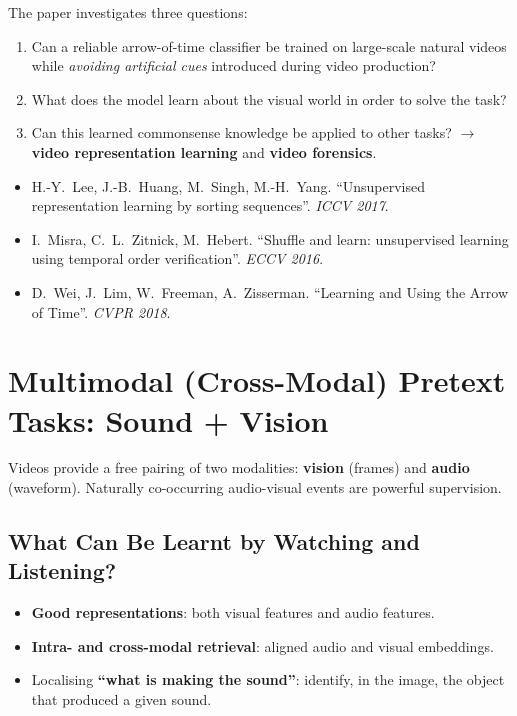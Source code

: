 \documentclass[11pt,a4paper]{article}
\theoremstyle{definition}
\theoremstyle{plain}
\theoremstyle{remark}
\begin{document}
The paper investigates three questions:
\begin{enumerate}
    \item Can a reliable arrow-of-time classifier be trained on large-scale natural videos while \emph{avoiding artificial cues} introduced during video production?
    \item What does the model learn about the visual world in order to solve the task?
    \item Can this learned commonsense knowledge be applied to other tasks? $\rightarrow$ \textbf{video representation learning} and \textbf{video forensics}.
\end{enumerate}

\begin{tcolorbox}[colback=blue!5!white,colframe=blue!60!black,title={References}]
\begin{itemize}[leftmargin=*]
    \item H.-Y.\ Lee, J.-B.\ Huang, M.\ Singh, M.-H.\ Yang. ``Unsupervised representation learning by sorting sequences''. \textit{ICCV 2017}.
    \item I.\ Misra, C.\ L.\ Zitnick, M.\ Hebert. ``Shuffle and learn: unsupervised learning using temporal order verification''. \textit{ECCV 2016}.
    \item D.\ Wei, J.\ Lim, W.\ Freeman, A.\ Zisserman. ``Learning and Using the Arrow of Time''. \textit{CVPR 2018}.
\end{itemize}
\end{tcolorbox}


\section{Multimodal (Cross-Modal) Pretext Tasks: Sound + Vision}

Videos provide a free pairing of two modalities: \textbf{vision} (frames) and \textbf{audio} (waveform). Naturally co-occurring audio-visual events are powerful supervision.

\subsection{What Can Be Learnt by Watching and Listening?}

\begin{itemize}
    \item \textbf{Good representations}: both visual features and audio features.
    \item \textbf{Intra- and cross-modal retrieval}: aligned audio and visual embeddings.
    \item Localising \textbf{``what is making the sound''}: identify, in the image, the object that produced a given sound.
\end{itemize}
\end{document}
